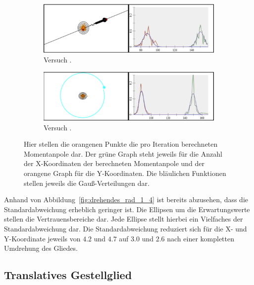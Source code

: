 \begin{figure}
    \centering
    \begin{subfigure}[t]{0.45\textwidth}
        \includegraphics[width=\textwidth]{gfx/drehendes_pendel_1.png}
        \caption{Versuch .}\label{fig:drehendes_pendel_1}
    \end{subfigure}
    \begin{subfigure}[t]{0.45\textwidth}
        \includegraphics[width=\textwidth]{gfx/drehendes_pendel_4.png}
        \caption{Versuch .}\label{fig:drehendes_pendel_4}
    \end{subfigure}
    \caption[Versuche  und ]{Hier stellen die orangenen Punkte die pro Iteration berechneten Momentanpole dar. Der grüne Graph steht jeweils für die Anzahl der X-Koordinaten der berechneten Momentanpole und der orangene Graph für die Y-Koordinaten. Die bläulichen Funktionen stellen jeweils die Gau{\ss}-Verteilungen dar.}
    \label{fig:drehendes_pendel_1_4}
\end{figure}

Anhand von Abbildung~\ref{fig:drehendes_rad_1_4} ist bereits abzusehen, dass die Standardabweichung erheblich geringer ist.
Die Ellipsen um die Erwartungswerte stellen die Vertrauensbereiche dar.
Jede Ellipse stellt hierbei ein Vielfaches der Standardabweichung dar.
Die Standardabweichung reduziert sich für die X- und Y-Koordinate jeweils von $4.2$ und $4.7$ auf $3.0$ und $2.6$ nach einer kompletten Umdrehung des Gliedes. 

\subsection{Translatives Gestellglied}

